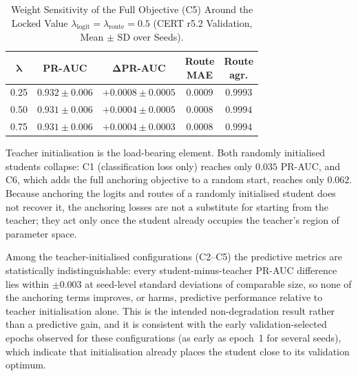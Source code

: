 \begin{table}[!tbp]
\caption{Weight Sensitivity of the Full Objective (C5) Around the Locked Value
\(\lambda_{\mathrm{logit}}=\lambda_{\mathrm{route}}=0.5\) (CERT r5.2 Validation,
Mean $\pm$ SD over Seeds).}
\label{tab:loss_ablation_sensitivity}
\centering
\footnotesize
\renewcommand{\arraystretch}{1.15}
\setlength{\tabcolsep}{4pt}
\begin{tabular*}{\columnwidth}{@{\extracolsep{\fill}}ccccc@{}}
\hline
\(\boldsymbol{\lambda}\) &
\textbf{PR-AUC} & $\boldsymbol{\Delta}$\textbf{PR-AUC} &
\shortstack{\textbf{Route}\\\textbf{MAE}} &
\shortstack{\textbf{Route}\\\textbf{agr.}} \\
\hline
0.25 & $0.932\pm0.006$ & $+0.0008\pm0.0005$ & $0.0009$ & $0.9993$ \\
0.50 & $0.931\pm0.006$ & $+0.0004\pm0.0005$ & $0.0008$ & $0.9994$ \\
0.75 & $0.931\pm0.006$ & $+0.0004\pm0.0003$ & $0.0008$ & $0.9994$ \\
\hline
\end{tabular*}
\end{table}

Teacher initialisation is the load-bearing element. Both randomly initialised
students collapse: C1 (classification loss only) reaches only
\(0.035\) PR-AUC, and C6, which adds the full anchoring objective to a random
start, reaches only \(0.062\). Because anchoring the logits and routes of a
randomly initialised student does not recover it, the anchoring losses are not
a substitute for starting from the teacher; they act only once the student
already occupies the teacher's region of parameter space. 

\smallskip
Among the
teacher-initialised configurations (C2--C5) the predictive metrics are
statistically indistinguishable: every student-minus-teacher PR-AUC difference
lies within \(\pm0.003\) at seed-level standard deviations of comparable size,
so none of the anchoring terms improves, or harms, predictive performance
relative to teacher initialisation alone. This is the intended
non-degradation result rather than a predictive gain, and it is consistent
with the early validation-selected epochs observed for these configurations
(as early as epoch~1 for several seeds), which indicate that initialisation
already places the student close to its validation optimum.

